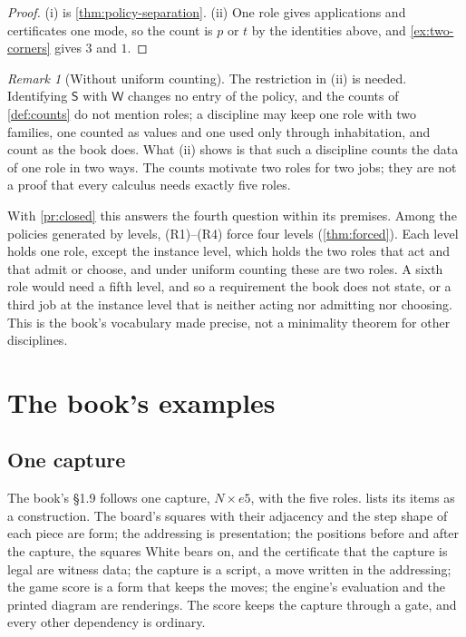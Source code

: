 \documentclass[11pt]{article}
\numberwithin{equation}{section}
\theoremstyle{definition}
\theoremstyle{plain}
\theoremstyle{remark}
\newtheorem{remark}[definition]{Remark}
\newcommand{\Wit}{\mathsf W}
\newcommand{\Scr}{\mathsf S}
\begin{document}
\begin{proof}
(i) is \cref{thm:policy-separation}.  (ii) One role gives applications and
certificates one mode, so the count is \(p\) or \(t\) by the identities
above, and \cref{ex:two-corners} gives \(3\) and \(1\).
\end{proof}

\begin{remark}[Without uniform counting]\label{rem:collapse}
The restriction in (ii) is needed.  Identifying \(\Scr\) with \(\Wit\)
changes no entry of the policy, and the counts of \cref{def:counts} do not
mention roles; a discipline may keep one role with two families, one counted
as values and one used only through inhabitation, and count as the book does.
What (ii) shows is that such a discipline counts the data of one role in two
ways.  The counts motivate two roles for two jobs; they are not a proof that
every calculus needs exactly five roles.
\end{remark}

With \cref{pr:closed} this answers the fourth question within its premises.
Among the policies generated by levels, (R1)--(R4) force four levels
(\cref{thm:forced}).  Each level holds one role, except the instance level,
which holds the two roles that act and that admit or choose, and under
uniform counting these are two roles.  A sixth role would need a fifth level,
and so a requirement the book does not state, or a third job at the instance
level that is neither acting nor admitting nor choosing.  This is the book's
vocabulary made precise, not a minimality theorem for other disciplines.

\section{The book's examples}\label{sec:examples}

\subsection{One capture}\label{sec:chess}

The book's \S1.9 follows one capture, \(N{\times}e5\), with the five roles.
 lists its items as a construction.  The board's squares with
their adjacency and the step shape of each piece are form; the addressing is
presentation; the positions before and after the capture, the squares White
bears on, and the certificate that the capture is legal are witness data; the
capture is a script, a move written in the addressing; the game score is a
form that keeps the moves; the engine's evaluation and the printed diagram are
renderings.  The score keeps the capture through a gate, and every other
dependency is ordinary.
\end{document}
